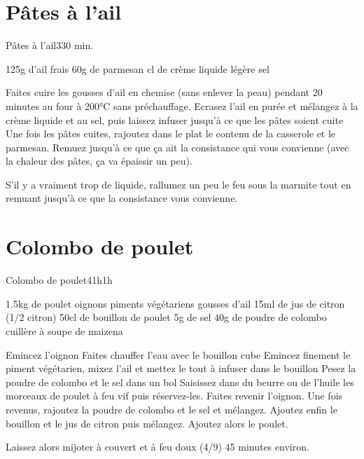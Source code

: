 {\section{Pâtes à l'ail}
\begin{recette}{Pâtes à l'ail}{3}{30 min.}{}
\begin{ingredients}
\ingredient 125g d'ail frais
\ingredient 60g de parmesan
 cl de crème liquide légère 
\ingredient sel
\end{ingredients}


\begin{preparation}
\etape Faites cuire les gousses d'ail en chemise (sans enlever la peau) pendant 20 minutes au four à 200°C sans préchauffage. 
\etape Ecrasez l'ail en purée et mélangez à la crème liquide et au sel, puis laissez infuser jusqu'à ce que les pâtes soient cuite
\etape Une fois les pâtes cuites, rajoutez dans le plat le contenu de la casserole et le parmesan. Remuez jusqu'à ce que ça ait la consistance qui vous convienne (avec la chaleur des pâtes, ça va épaissir un peu).
\begin{remarque}
S'il y a vraiment trop de liquide, rallumez un peu le feu sous la marmite tout en remuant jusqu'à ce que la consistance vous convienne.
\end{remarque}
\end{preparation}
\end{recette}

\section{Colombo de poulet}
\begin{recette}{Colombo de poulet}{4}{1h}{1h}
\begin{ingredients}
\ingredient 1.5kg de poulet
 oignons
 piments végétariens
 gousses d'ail
\ingredient 15ml de jus de citron (1/2 citron)
\ingredient 50cl de bouillon de poulet
\ingredient 5g de sel
\ingredient 40g de poudre de colombo
 cuillère à soupe de maizena
\end{ingredients}


\begin{preparation}
\etape Emincez l'oignon
\etape Faites chauffer l'eau avec le bouillon cube
\etape Emincez finement le piment végétarien, mixez l'ail et mettez le tout à infuser dans le bouillon
\etape Pesez la poudre de colombo et le sel dans un bol
\etape Saisissez dans du beurre ou de l'huile les morceaux de poulet à feu vif puis réservez-les.
\etape Faites revenir l'oignon.
\etape Une fois revenus, rajoutez la poudre de colombo et le sel et mélangez. 
\etape Ajoutez enfin le bouillon et le jus de citron puis mélangez. Ajoutez alors le poulet.
\end{preparation}

\begin{cuisson}
Laissez alors mijoter à couvert et à feu doux (4/9) 45 minutes environ.
\end{cuisson}
\end{recette}

}%
